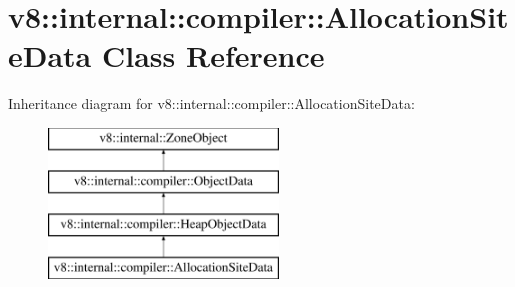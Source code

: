 \hypertarget{classv8_1_1internal_1_1compiler_1_1AllocationSiteData}{}\section{v8\+:\+:internal\+:\+:compiler\+:\+:Allocation\+Site\+Data Class Reference}
\label{classv8_1_1internal_1_1compiler_1_1AllocationSiteData}
Inheritance diagram for v8\+:\+:internal\+:\+:compiler\+:\+:Allocation\+Site\+Data\+:\begin{figure}[H]
\begin{center}
\leavevmode
\includegraphics[height=4.000000cm]{classv8_1_1internal_1_1compiler_1_1AllocationSiteData}
\end{center}
\end{figure}
